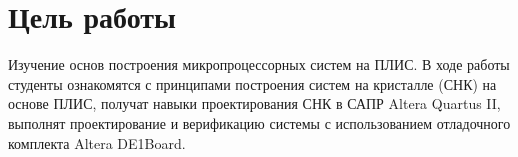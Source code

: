 \section*{Цель работы}

Изучение основ построения микропроцессорных систем на ПЛИС. В ходе работы
студенты ознакомятся с принципами построения систем на кристалле (СНК) на
основе ПЛИС, получат навыки проектирования СНК в САПР Altera Quartus II,
выполнят проектирование и верификацию системы с использованием отладочного
комплекта Altera DE1Board. 
